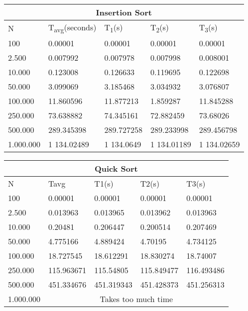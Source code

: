 \documentclass[]{article}
\begin{document}
\begin{table}[H]
	\centering
\begin{tabular}{|l|l|l|l|l|}
\hline
\multicolumn{5}{|c|}{Insertion Sort} \\ \hline
N & T\textsubscript{avg}(seconds) & T\textsubscript{1}(s) & T\textsubscript{2}(s) & T\textsubscript{3}(s) \\ \hline
100 & 0.00001 & 0.00001 & 0.00001 & 0.00001 \\ \hline
2.500 & 0.007992 & 0.007978 & 0.007998 & 0.008001 \\ \hline
10.000 & 0.123008 & 0.126633 & 0.119695 & 0.122698 \\ \hline
50.000 & 3.099069 & 3.185468 & 3.034932 & 3.076807 \\ \hline
100.000 & 11.860596 & 11.877213 & 1.859287 & 11.845288 \\ \hline
250.000 & 73.638882 & 74.345161 & 72.882459 & 73.68026 \\ \hline
500.000 & 289.345398 & 289.727258 & 289.233998 & 289.456798 \\ \hline
1.000.000 & 1 134.02489 & 1 134.0649 & 1 134.01189 & 1 134.02659 \\ \hline
\end{tabular}
\end{table}

\iffalse
	QUICK SORT
\fi

\begin{table}[H]
	\centering
\begin{tabular}{|l|l|l|l|l|}
\hline
\multicolumn{5}{|c|}{Quick Sort} \\ \hline
N & Tavg & T1(s) & T2(s) & T3(s) \\ \hline
100 & 0.00001 & 0.00001 & 0.00001 & 0.00001 \\ \hline
2.500 & 0.013963 & 0.013965 & 0.013962 & 0.013963 \\ \hline
10.000 & 0.20481 & 0.206447 & 0.200514 & 0.207469 \\ \hline
50.000 & 4.775166 & 4.889424 & 4.70195 & 4.734125 \\ \hline
100.000 & 18.727545 & 18.612291 & 18.830274 & 18.74007 \\ \hline
250.000 & 115.963671 & 115.54805 & 115.849477 & 116.493486 \\ \hline
500.000 & 451.334676 & 451.319343 & 451.428373 & 451.256313 \\ \hline
1.000.000 & \multicolumn{4}{c|}{Takes too much time} \\ \hline
\end{tabular}
\end{table}
\end{document}
